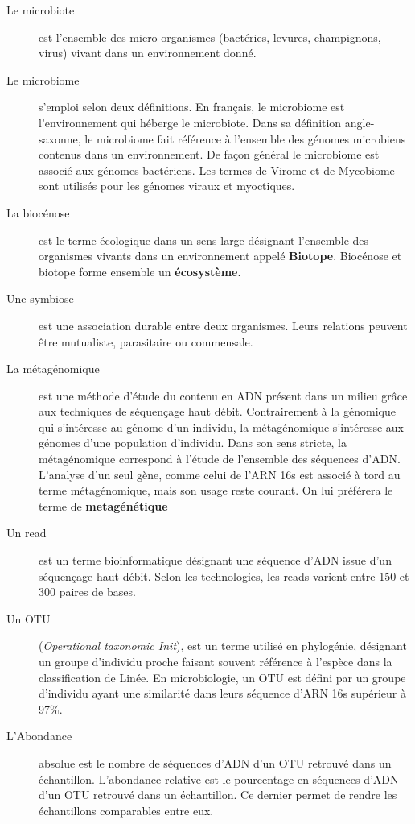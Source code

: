 \documentclass[12pt,a4paper]{article}
\begin{document}
\begin{description}
  \item[Le microbiote] est l’ensemble des micro-organismes (bactéries, levures, champignons, virus) vivant dans un environnement donné.
  
\item[Le microbiome] s’emploi selon deux définitions. En français, le microbiome est l'environnement qui héberge le microbiote. Dans sa définition angle-saxonne, le microbiome fait référence à l’ensemble des génomes microbiens contenus dans un environnement. 
De façon général le microbiome est associé aux génomes bactériens. Les termes de Virome et de Mycobiome sont utilisés pour les génomes viraux et myoctiques. 

\item[La biocénose] est le terme écologique dans un sens large désignant l'ensemble des organismes vivants dans un environnement appelé \textbf{Biotope}. Biocénose et biotope forme ensemble un \textbf{écosystème}.

\item[Une symbiose] est une association durable entre deux organismes. Leurs relations peuvent être mutualiste, parasitaire ou commensale.

\item[La métagénomique] est une méthode d’étude du contenu en ADN présent dans un milieu grâce aux techniques de séquençage haut débit. Contrairement à la génomique qui s’intéresse au génome d’un individu, la métagénomique s’intéresse aux génomes d’une population d’individu.
Dans son sens stricte, la métagénomique correspond à l’étude de l’ensemble des séquences d'ADN. L’analyse d’un seul gène, comme celui de l’ARN 16s est associé à tord au terme métagénomique, mais son usage reste courant. On lui préférera le terme de \textbf{metagénétique}

\item[Un read] est un terme bioinformatique désignant une séquence d’ADN issue d’un séquençage haut débit. Selon les technologies, les reads varient entre 150 et 300 paires de bases.

\item[Un OTU] (\textit{Operational taxonomic Init}), est un terme utilisé en phylogénie, désignant un groupe d’individu proche faisant souvent référence à l’espèce dans la classification de Linée.
En microbiologie, un OTU est défini par un groupe d’individu ayant une similarité dans leurs séquence d'ARN 16s supérieur à 97\%.

\item[L'Abondance] absolue est le nombre de séquences d'ADN d'un OTU retrouvé dans un échantillon. 
L’abondance relative est le pourcentage en séquences d'ADN d'un OTU retrouvé dans un échantillon. Ce dernier permet de rendre les échantillons comparables entre eux.


\end{description}
\end{document}
